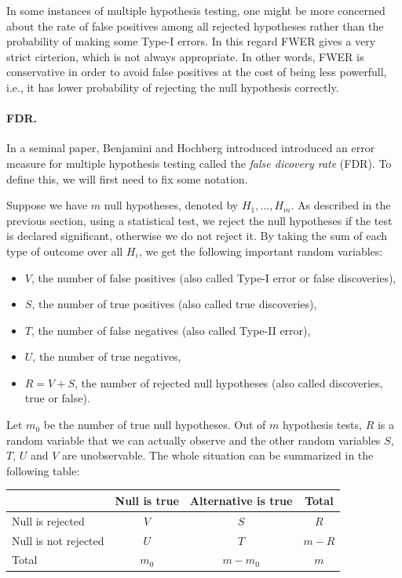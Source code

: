 In some instances of multiple hypothesis testing, one might be more concerned about the rate of false positives among all rejected hypotheses rather than the probability of making some Type-I errors.
In this regard FWER gives a very strict cirterion, which is not always appropriate.
In other words, FWER is conservative in order to avoid false positives at the cost of being less powerfull, i.e., it has lower probability of rejecting the null hypothesis correctly.

\paragraph{FDR.}
In a seminal paper, Benjamini and Hochberg introduced introduced an error measure for multiple hypothesis testing called the \emph{false dicovery rate} (FDR). To define this, we will first need to fix some notation.

Suppose we have $m$ null hypotheses, denoted by $H_1,\dots, H_m$.
As described in the previous section, using a statistical test, we reject the null hypotheses if the test is declared significant, otherwise we do not reject it.
By taking the sum of each type of outcome over all $H_i$, we get the following important random variables:
\begin{itemize}
\item
$V$, the number of false positives (also called Type-I error or false discoveries),
\item
$S$, the number of true positives (also called true discoveries),
\item
$T$, the number of false negatives (also called Type-II error),
\item
$U$, the number of true negatives,
\item
$R = V + S$, the number of rejected null hypotheses (also called discoveries, true or false).
\end{itemize}
Let $m_0$ be the number of true null hypotheses.
Out of $m$ hypothesis tests, $R$ is a random variable that we can actually observe and the other random variables $S$, $T$, $U$ and $V$ are unobservable.
The whole situation can be summarized in the following table:

\begin{center}
\begin{tabular}[h]{|l|c|c|c|}
\hline
& Null  is true & Alternative is true & Total\\
\hline
Null is rejected & $V$ & $S$ & $R$\\
\hline
Null is not rejected  & $U$ & $T$ & $m - R$\\
\hline
Total  & $m_0$ & $m - m_0$ & $m$\\
\hline
\end{tabular}
\end{center}

